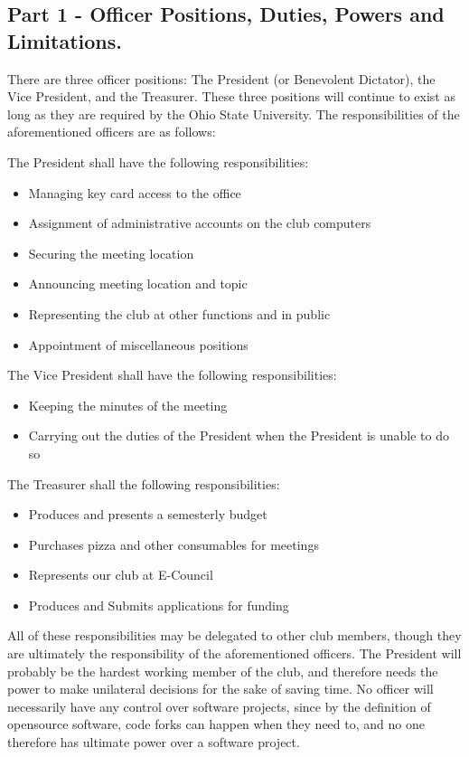 \documentclass{article}
\begin{document}

	\subsection{Part 1 - Officer Positions, Duties, Powers and Limitations.}

	There are three officer positions: The President (or Benevolent Dictator),
	the Vice President, and the Treasurer.  These three positions will continue
	to exist as long as they are required by the Ohio State University.  The
	responsibilities of the aforementioned officers are as follows:

	The President shall have the following responsibilities:

	\begin{itemize} \item Managing key card access to the office \item
			Assignment of administrative accounts on the club computers \item
			Securing the meeting location \item Announcing meeting location and
			topic \item Representing the club at other functions and in public
	\item Appointment of miscellaneous positions \end{itemize}

	The Vice President shall have the following responsibilities:
	\begin{itemize} \item Keeping the minutes of the meeting \item Carrying out
		the duties of the President when the President is unable to do so
\end{itemize}

	The Treasurer shall the following responsibilities:

	\begin{itemize} \item Produces and presents a semesterly budget \item
	Purchases pizza and other consumables for meetings \item Represents our
	club at E-Council \item Produces and Submits applications for funding
\end{itemize}

	All of these responsibilities may be delegated to other club members,
	though they are ultimately the responsibility of the aforementioned
	officers.  The President will probably be the hardest working member of the
	club, and therefore needs the power to make unilateral decisions for the
	sake of saving time.  No officer will necessarily have any control over
	software projects, since by the definition of opensource software, code
	forks can happen when they need to, and no one therefore has ultimate power
	over a software project.
\end{document}
